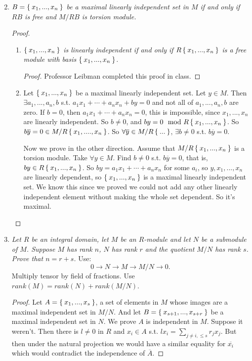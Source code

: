 \documentclass[12pt]{amsbook}
\theoremstyle{plain}
\numberwithin{section}{chapter}
\numberwithin{equation}{chapter}
\theoremstyle{definition}
\theoremstyle{remark}
\renewcommand{\leq}{\leqslant}
\renewcommand{\bar}{\overline}%
\begin{document}
\begin{enumerate}[label=\arabic*.]
\setcounter{enumi}{1}
\item \textit{$B = \Set{x_1,...,x_n}$ be a maximal linearly independent set in $M$ if and only if $RB$ is free and $M/RB$ is torsion module. }

\begin{proof}
\begin{enumerate}
\item 
\textit{$\Set{x_1,...,x_n}$ is linearly independent if and only if $R\Set{x_1,...,x_n}$ is a free module with basis $\Set{x_1,...,x_n}$. }
\begin{proof}
Professor Leibman completed this proof in class. 
\end{proof}
\item Let $\Set{x_1,...,x_n}$ be a maximal linearly independent set. Let $y  \in M$. Then $\exists a_1,...,a_n,b$ s.t. $a_1x_1 + \cdots + a_nx_n + by = 0$ and not all of $a_1,...,a_n,b$ are zero. If $b = 0$, then $a_1x_1 + \cdots + a_nx_n = 0$, this is impossible, since $x_1,...,x_n$ are linearly independent. So $b \neq 0$, and $by=  0 \mod R\Set{x_1,...,x_n}$. So $b\bar{y} = 0 \in M/R\Set{x_1,....,x_n}$. So $\forall \bar{y} \in M/R\Set{...}$, $\exists b \neq 0$ s.t. $b\bar{y} = 0$. 

Now we prove in the other direction. Assume that $M/R\Set{x_1,...,x_n}$ is a torsion module. Take $\forall y \in M$. Find $b \neq 0$ s.t. $b \bar{y} = 0$, that is, $by \in R\Set{x_1,...,x_n}$. So $by = a_1x_1 + \cdots + a_nx_n$ for some $a_i$, so $y,x_1,...,x_n$ are linearly dependent, so $\Set{x_1,...,x_n}$ is a maximal linearly independent set. We know this since we proved we could not add any other linearly independent element without making the whole set dependent. So it's maximal. 
\end{enumerate}
\end{proof}

\setcounter{enumi}{3}
\item \textit{Let $R$ be an integral domain, let $M$ be an $R$-module and let $N$ be a submodule of $M$. Suppose $M$ has rank $n$, $N$ has rank $r$ and the quotient $M/N$ has rank $s$. Prove that $n = r +s$. }
Use:
$$
0 \to N \to M \to M/N \to 0.
$$
Multiply tensor by field of fractions. Use $rank(M) = rank(N) + rank(M/N)$. 

\begin{proof}
Let $A = \Set{x_1,...,x_s}$, a set of elements in $M$ whose images are a maximal independent set in $M/N$. And let $B = \Set{x_{s + 1},...,x_{s + r}}$ be a maximal independent set in $N$. We prove $A$ is independent in $M$. Suppose it weren't. Then there is $l \neq 0$ in $R$ and $x_i \in A$ s.t. $lx_i = \sum_{j \neq i, \leq s} r_jx_j$. But then under the natural projection we would have a similar equality for $\bar{x_i}$ which would contradict the independence of $\bar{A}$. 


\end{proof}
\end{enumerate}
\end{document}
